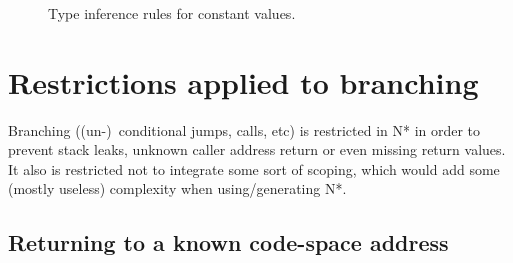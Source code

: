 \begin{figure}[htb]
  \centering

  \begin{prooftree}
  \end{prooftree}
  \\\vspace{\baselineskip}
  \begin{prooftree}
  \end{prooftree}
  \\\vspace{\baselineskip}
  \begin{prooftree}
  \end{prooftree}
  \\\vspace{\baselineskip}
  \begin{prooftree}
  \end{prooftree}

  \caption{Type inference rules for constant values.}
  \label{fig:nstar-common-constvalue-typerules}
\end{figure}

\section{Restrictions applied to branching}\label{sec:nstar-common-bs-restrictions}

Branching ((un-)\ conditional jumps, calls, etc) is restricted in N* in order to prevent stack leaks, unknown caller address return or even missing return values.
It also is restricted not to integrate some sort of scoping, which would add some (mostly useless) complexity when using/generating N*.

\subsection{Returning to a known code-space address}\label{subsec:nstar-common-bs-restrictions-ret}

